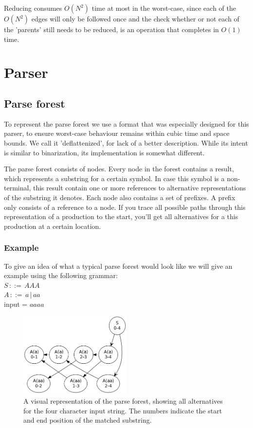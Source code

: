 \documentclass[a4paper,10pt]{article}
\begin{document}
Reducing consumes $O(N^2)$ time at most in the worst-case, since each of the $O(N^2)$ edges will only be followed once and the check whether or not each of the 'parents' still needs to be reduced, is an operation that completes in $O(1)$ time.

\section{Parser}

\subsection{Parse forest}

To represent the parse forest we use a format that was especially designed for this parser, to ensure worst-case behaviour remains within cubic time and space bounds. We call it 'deflattenized', for lack of a better description. While its intent is similar to binarization, its implementation is somewhat different.

The parse forest consists of nodes. Every node in the forest contains a result, which represents a substring for a certain symbol. In case this symbol is a non-terminal, this result contain one or more references to alternative representations of the substring it denotes. Each node also contains a set of prefixes. A prefix only consists of a reference to a node. If you trace all possible paths through this representation of a production to the start, you'll get all alternatives for a this production at a certain location.

\subsubsection{Example}
To give an idea of what a typical parse forest would look like we will give an example using the following grammar:\\
$S\,::=\,AAA$\\
$A\,::=\,a\,|\,aa$\\
input = $aaaa$

\begin{figure}[H]
\centering
\includegraphics[width=0.5\textwidth]{a_aa-forest.png}
\caption{A visual representation of the parse forest, showing all alternatives for the four character input string. The numbers indicate the start and end position of the matched substring.}
\end{figure}
\end{document}
